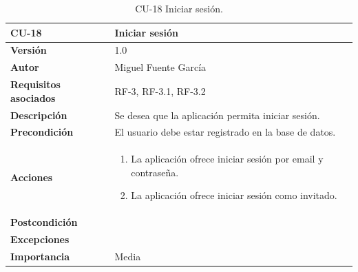 \begin{table}[p]
	\centering
	\begin{tabularx}{\linewidth}{ p{} p{} }
		\toprule
		\textbf{CU-18}    & \textbf{Iniciar sesión}\\
		\toprule
		\textbf{Versión}              & 1.0    \\
		\textbf{Autor}                & Miguel Fuente García \\
		\textbf{Requisitos asociados} & RF-3, RF-3.1, RF-3.2 \\
		\textbf{Descripción}          & Se desea que la aplicación permita iniciar sesión. \\
		\textbf{Precondición}         & El usuario debe estar registrado en la base de datos. \\
		\textbf{Acciones}             &
		\begin{enumerate}
			\def\labelenumi{\arabic{enumi}.}
			\tightlist
			\item La aplicación ofrece iniciar sesión por email y contraseña.
            \item La aplicación ofrece iniciar sesión como invitado.

		\end{enumerate}\\
		\textbf{Postcondición}        &  \\
		\textbf{Excepciones}          &  \\
		\textbf{Importancia}          & Media  \\
		\bottomrule
	\end{tabularx}
	\caption{CU-18 Iniciar sesión.}
\end{table}

